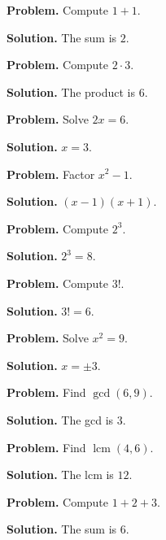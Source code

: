 \begin{example}\label{ex:sec13-1}
\textbf{Problem.} Compute $1+1$.

\textbf{Solution.} The sum is $2$.
\end{example}

\begin{example}\label{ex:sec13-2}
\textbf{Problem.} Compute $2\cdot3$.

\textbf{Solution.} The product is $6$.
\end{example}

\begin{example}\label{ex:sec13-3}
\textbf{Problem.} Solve $2x=6$.

\textbf{Solution.} $x=3$.
\end{example}

\begin{example}\label{ex:sec13-4}
\textbf{Problem.} Factor $x^2-1$.

\textbf{Solution.} $(x-1)(x+1)$.
\end{example}

\begin{example}\label{ex:sec13-5}
\textbf{Problem.} Compute $2^3$.

\textbf{Solution.} $2^3=8$.
\end{example}

\begin{example}\label{ex:sec13-6}
\textbf{Problem.} Compute $3!$.

\textbf{Solution.} $3!=6$.
\end{example}

\begin{example}\label{ex:sec13-7}
\textbf{Problem.} Solve $x^2=9$.

\textbf{Solution.} $x=\pm3$.
\end{example}

\begin{example}\label{ex:sec13-8}
\textbf{Problem.} Find $\gcd(6,9)$.

\textbf{Solution.} The gcd is $3$.
\end{example}

\begin{example}\label{ex:sec13-9}
\textbf{Problem.} Find $\operatorname{lcm}(4,6)$.

\textbf{Solution.} The lcm is $12$.
\end{example}

\begin{example}\label{ex:sec13-10}
\textbf{Problem.} Compute $1+2+3$.

\textbf{Solution.} The sum is $6$.
\end{example}
